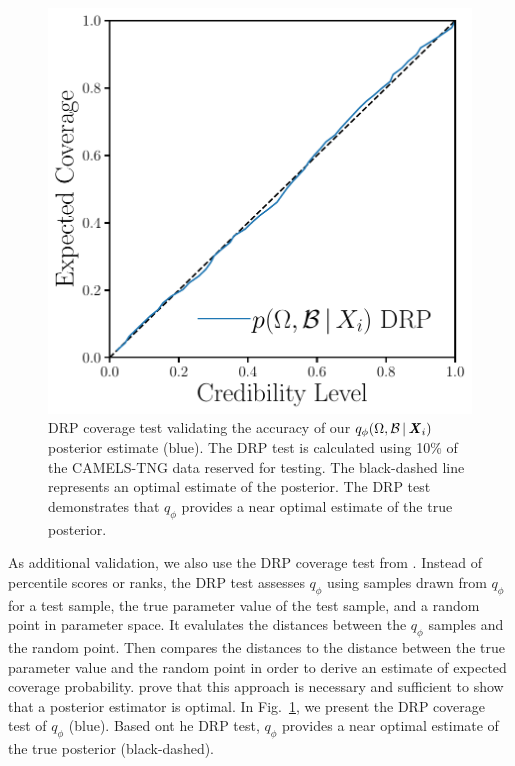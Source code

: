 \begin{figure}[ht]
\vskip 0.2in
\begin{center}
    \centerline{\includegraphics[width=0.4\columnwidth]{figs/tarp_p_omega_x.pdf}}
    \caption{DRP coverage test validating the accuracy of our 
    $q_{\phi}(\Omega, \mathcal{B}\,|\, {\textbf{\textit{X}}_i})$ posterior estimate (blue).
    The DRP test is calculated using  10\% of the CAMELS-TNG data reserved for
    testing.
    The black-dashed line represents an optimal estimate of the posterior.
    The DRP test demonstrates that $q_\phi$ provides a near optimal
    estimate of the true posterior.
    }\label{fig:tarp}
\end{center}
\vskip -0.2in
\end{figure}

As additional validation, we also use the DRP coverage test from
\cite{lemos2023}.
Instead of percentile scores or ranks, the DRP test assesses $q_\phi$ using
samples drawn from $q_\phi$ for a test sample, the true parameter value of the
test sample, and a random point in parameter space. 
It evalulates the distances between the $q_\phi$ samples and the random point. 
Then compares the distances to the distance between the true parameter value
and the random point in order to derive an estimate of expected coverage
probability. 
\cite{lemos2023} prove that this approach is necessary and sufficient to show
that a posterior estimator is optimal.
In Fig.~\ref{fig:tarp}, we present the DRP coverage test of $q_\phi$ (blue). 
Based ont he DRP test, $q_\phi$ provides a near optimal estimate of the
true posterior (black-dashed). 

